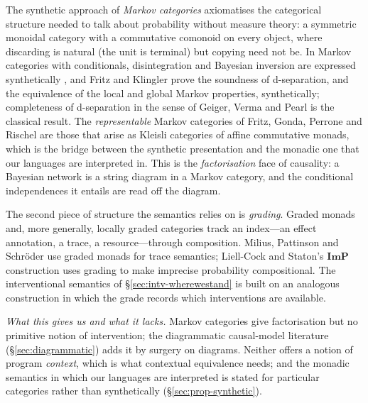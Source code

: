 The synthetic approach of \emph{Markov categories} \cite{fritz2020synthetic,fritz2019probability} axiomatises the categorical structure needed to talk about probability without measure theory: a symmetric monoidal category with a commutative comonoid on every object, where discarding is natural (the unit is terminal) but copying need not be. In Markov categories with conditionals, disintegration and Bayesian inversion are expressed synthetically \cite{cho2019disintegration,fritz2020synthetic}, and Fritz and Klingler \cite{fritz2023dseparation} prove the soundness of d-separation, and the equivalence of the local and global Markov properties, synthetically; completeness of d-separation in the sense of Geiger, Verma and Pearl is the classical result. The \emph{representable} Markov categories of Fritz, Gonda, Perrone and Rischel \cite{fritz2023representable} are those that arise as Kleisli categories of affine commutative monads, which is the bridge between the synthetic presentation and the monadic one that our languages are interpreted in. This is the \emph{factorisation} face of causality: a Bayesian network is a string diagram in a Markov category, and the conditional independences it entails are read off the diagram.

The second piece of structure the semantics relies on is \emph{grading}. Graded monads \cite{katsumata2014_graded_strong_monad,orchard2020unifying,fujii2016towards,dorsch2019graded} and, more generally, locally graded categories \cite{levy2019locallygraded,sarkis2025string} track an index---an effect annotation, a trace, a resource---through composition. Milius, Pattinson and Schröder \cite{milius2015gradedtrace} use graded monads for trace semantics; Liell-Cock and Staton's $\mathbf{ImP}$ construction \cite{liell2025compositional} uses grading to make imprecise probability compositional. The interventional semantics of \S\ref{sec:intv-wherewestand} is built on an analogous construction in which the grade records which interventions are available.

\emph{What this gives us and what it lacks.} Markov categories give factorisation but no primitive notion of intervention; the diagrammatic causal-model literature (\S\ref{sec:diagrammatic}) adds it by surgery on diagrams. Neither offers a notion of program \emph{context}, which is what contextual equivalence needs; and the monadic semantics in which our languages are interpreted is stated for particular categories rather than synthetically (\S\ref{sec:prop-synthetic}).

